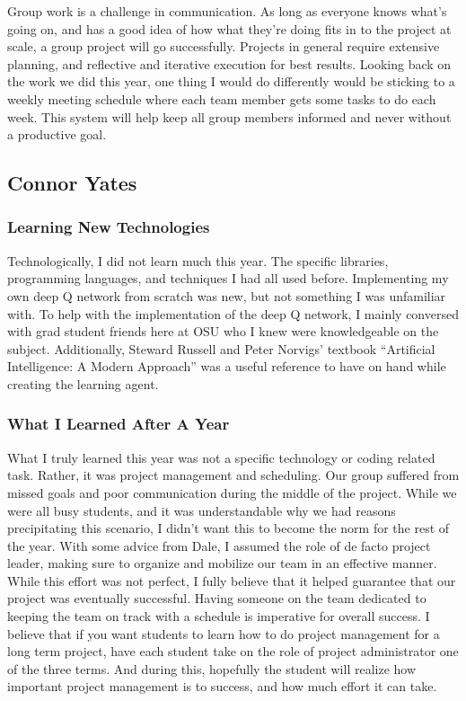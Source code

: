 Group work is a challenge in communication. As long as everyone knows what's going on, and has a good idea of how what they're doing fits in to the project at scale,
a group project will go successfully. Projects in general require extensive planning, and reflective and iterative execution for best results. Looking back on the work
we did this year, one thing I would do differently would be sticking to a weekly meeting schedule where each team member gets some tasks to do each week. This system
will help keep all group members informed and never without a productive goal.

\subsection{Connor Yates}
\subsubsection{Learning New Technologies}
Technologically, I did not learn much this year. The specific libraries, programming languages, and techniques I had all used before. Implementing my own deep Q network from scratch was new, but not something I was unfamiliar with. To help with the implementation of the deep Q network, I mainly conversed with grad student friends here at OSU who I knew were knowledgeable on the subject. Additionally, Steward Russell and Peter Norvigs' textbook ``Artificial Intelligence: A Modern Approach'' was a useful reference to have on hand while creating the learning agent.
\subsubsection{What I Learned After A Year}
What I truly learned this year was not a specific technology or coding related task. Rather, it was project management and scheduling. Our group suffered from missed goals and poor communication during the middle of the project. While we were all busy students, and it was understandable why we had reasons precipitating this scenario, I didn't want this to become the norm for the rest of the year. With some advice from Dale, I assumed the role of de facto project leader, making sure to organize and mobilize our team in an effective manner. While this effort was not perfect, I fully believe that it helped guarantee that our project was eventually successful. Having someone on the team dedicated to keeping the team on track with a schedule is imperative for overall success. I believe that if you want students to learn how to do project management for a long term project, have each student take on the role of project administrator one of the three terms. And during this, hopefully the student will realize how important project management is to success, and how much effort it can take.

